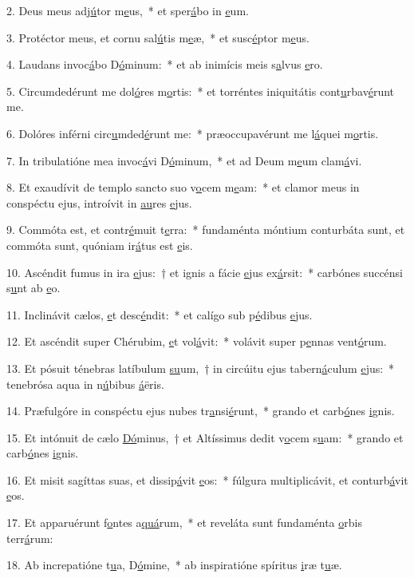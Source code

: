 2. Deus meus adj\uline{ú}tor m\uline{e}us,~* et sper\uline{á}bo in \uline{e}um.\par 
3. Protéctor meus, et cornu sal\uline{ú}tis m\uline{e}æ,~* et susc\uline{é}ptor m\uline{e}us.\par 
4. Laudans invoc\uline{á}bo D\uline{ó}minum:~* et ab inimícis meis s\uline{a}lvus \uline{e}ro.\par 
5. Circumdedérunt me dol\uline{ó}res m\uline{o}rtis:~* et torréntes iniquitátis cont\uline{u}rbav\uline{é}runt me.\par 
6. Dolóres inférni circ\uline{u}mded\uline{é}runt me:~* præoccupavérunt me l\uline{á}quei m\uline{o}rtis.\par 
7. In tribulatióne mea invoc\uline{á}vi D\uline{ó}minum,~* et ad Deum m\uline{e}um clam\uline{á}vi.\par 
8. Et exaudívit de templo sancto suo v\uline{o}cem m\uline{e}am:~* et clamor meus in conspéctu ejus, introívit in \uline{au}res \uline{e}jus.\par 
9. Commóta est, et contr\uline{é}muit t\uline{e}rra:~* fundaménta móntium conturbáta sunt, et commóta sunt, quóniam ir\uline{á}tus est \uline{e}is.\par 
10. Ascéndit fumus in ira \uline{e}jus:~† et ignis a fácie \uline{e}jus ex\uline{á}rsit:~* carbónes succénsi s\uline{u}nt ab \uline{e}o.\par 
11. Inclinávit cælos, \uline{e}t desc\uline{é}ndit:~* et calígo sub p\uline{é}dibus \uline{e}jus.\par 
12. Et ascéndit super Chérubim, \uline{e}t vol\uline{á}vit:~* volávit super p\uline{e}nnas vent\uline{ó}rum.\par 
13. Et pósuit ténebras latíbulum \uline{su}um,~† in circúitu ejus tabern\uline{á}culum \uline{e}jus:~* tenebrósa aqua in n\uline{ú}bibus \uline{á}ëris.\par 
14. Præfulgóre in conspéctu ejus nubes tr\uline{a}nsi\uline{é}runt,~* grando et carb\uline{ó}nes \uline{i}gnis.\par 
15. Et intónuit de cælo \uline{Dó}minus,~† et Altíssimus dedit v\uline{o}cem s\uline{u}am:~* grando et carb\uline{ó}nes \uline{i}gnis.\par 
16. Et misit sagíttas suas, et dissip\uline{á}vit \uline{e}os:~* fúlgura multiplicávit, et conturb\uline{á}vit \uline{e}os.\par 
17. Et apparuérunt f\uline{o}ntes a\uline{quá}rum,~* et reveláta sunt fundaménta \uline{o}rbis terr\uline{á}rum:\par 
18. Ab increpatióne t\uline{u}a, D\uline{ó}mine,~* ab inspiratióne spíritus \uline{i}ræ t\uline{u}æ.\par 

